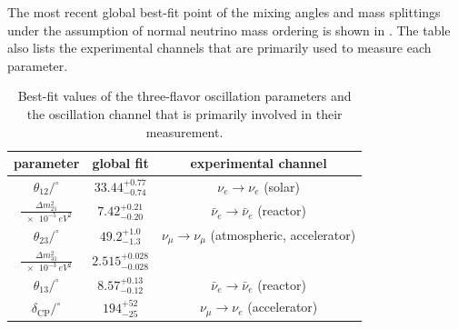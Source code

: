The most recent global best-fit point\cite{Esteban:2020cvm} of the mixing angles and mass splittings under the assumption of normal neutrino mass ordering is shown in .
The table also lists the experimental channels that are primarily used to measure each parameter.
\begin{table}
\caption{Best-fit values of the three-flavor oscillation parameters and the oscillation channel that is primarily involved in their measurement.\label{tab:global-bfp}}
\begin{tabular}{ccc}\toprule
    parameter & global fit & experimental channel \\ \midrule
    $\theta_{12}/^\circ$                    & $33.44^{+0.77}_{-0.74}$   & $\nu_e \rightarrow \nu_e$ (solar)\\
    $\frac{\Delta m^2_{21}}{\SI{e-5}{eV^2}}$& $7.42^{+0.21}_{-0.20}$    & $\bar{\nu}_e \rightarrow \bar{\nu}_e$ (reactor)\\
    $\theta_{23}/^\circ$                    & $49.2^{+1.0}_{-1.3} $     & $\nu_\mu \rightarrow \nu_\mu$  (atmospheric, accelerator)\\
    $\frac{\Delta m^2_{31}}{\SI{e-3}{eV^2}}$& $2.515^{+0.028}_{-0.028}$ & \\
    $\theta_{13}/^\circ$                    & $8.57^{+0.13}_{-0.12} $   & $\bar{\nu}_e \rightarrow \bar{\nu}_e$ (reactor)\\
    $\delta_\mathrm{CP}/^\circ$             & $194^{+52}_{-25}$         & $\nu_\mu \rightarrow \nu_e$ (accelerator)\\ \bottomrule
\end{tabular}
\end{table}

